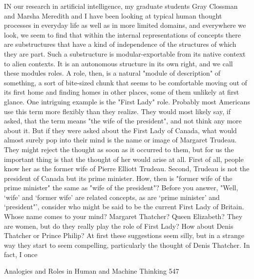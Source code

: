 IN our research in artificial intelligence, my graduate students Gray Clossman and
Marsha Meredith and I have been looking at typical human thought processes in
everyday life as well as in more limited domains, and everywhere we look, we seem
to find that within the internal representations of concepts there are substructures that
have a kind of independence of the structures of which they are part. Such a
substructure is modular-exportable from its native context to alien contexts. It is an
autonomous structure in its own right, and we call these modules roles. A role, then, is
a natural "module of description" of something, a sort of bite-sized chunk that seems
to be comfortable moving out of its first home and finding homes in other places,
some of them unlikely at first glance.
        One intriguing example is the "First Lady" role. Probably most Americans use
this term more flexibly than they realize. They would most likely say, if asked, that
the term means "the wife of the president", and not think any more about it. But if
they were asked about the First Lady of Canada, what would almost surely pop into
their mind is the name or image of Margaret Trudeau. They might reject the thought
as soon as it occurred to them, but for us the important thing is that the thought of her
would arise at all. First of all, people know her as the former wife of Pierre Elliott
Trudeau. Second, Trudeau is not the president of Canada but its prime minister. How,
then is "former wife of the prime minister" the same as "wife of the president"?
        Before you answer, "Well, `wife' and `former wife' are related concepts, as are
`prime minister' and `president"', consider who might be said to be the current First
Lady of Britain. Whose name comes to your mind? Margaret Thatcher? Queen
Elizabeth? They are women, but do they really play the role of First Lady? How about
Denis Thatcher or Prince Philip? At first these suggestions seem silly, but in a strange
way they start to seem compelling, particularly the thought of Denis Thatcher. In fact,
I once




Analogies and Roles in Human and Machine Thinking                                    547

